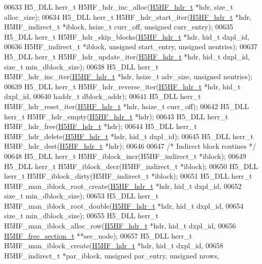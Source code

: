\begin{DoxyCode}
00633 H5\_DLL herr\_t H5HF\_hdr\_inc\_alloc(\hyperlink{struct_h5_h_f__hdr__t}{H5HF\_hdr\_t} *hdr, \textcolor{keywordtype}{size\_t} alloc\_size);
00634 H5\_DLL herr\_t H5HF\_hdr\_start\_iter(\hyperlink{struct_h5_h_f__hdr__t}{H5HF\_hdr\_t} *hdr, H5HF\_indirect\_t *iblock, hsize\_t curr\_off, \textcolor{keywordtype}{
      unsigned} curr\_entry);
00635 H5\_DLL herr\_t H5HF\_hdr\_skip\_blocks(\hyperlink{struct_h5_h_f__hdr__t}{H5HF\_hdr\_t} *hdr, hid\_t dxpl\_id,
00636     H5HF\_indirect\_t *iblock, \textcolor{keywordtype}{unsigned} start\_entry, \textcolor{keywordtype}{unsigned} nentries);
00637 H5\_DLL herr\_t H5HF\_hdr\_update\_iter(\hyperlink{struct_h5_h_f__hdr__t}{H5HF\_hdr\_t} *hdr, hid\_t dxpl\_id, \textcolor{keywordtype}{size\_t} min\_dblock\_size);
00638 H5\_DLL herr\_t H5HF\_hdr\_inc\_iter(\hyperlink{struct_h5_h_f__hdr__t}{H5HF\_hdr\_t} *hdr, hsize\_t adv\_size, \textcolor{keywordtype}{unsigned} nentries);
00639 H5\_DLL herr\_t H5HF\_hdr\_reverse\_iter(\hyperlink{struct_h5_h_f__hdr__t}{H5HF\_hdr\_t} *hdr, hid\_t dxpl\_id,
00640     haddr\_t dblock\_addr);
00641 H5\_DLL herr\_t H5HF\_hdr\_reset\_iter(\hyperlink{struct_h5_h_f__hdr__t}{H5HF\_hdr\_t} *hdr, hsize\_t curr\_off);
00642 H5\_DLL herr\_t H5HF\_hdr\_empty(\hyperlink{struct_h5_h_f__hdr__t}{H5HF\_hdr\_t} *hdr);
00643 H5\_DLL herr\_t H5HF\_hdr\_free(\hyperlink{struct_h5_h_f__hdr__t}{H5HF\_hdr\_t} *hdr);
00644 H5\_DLL herr\_t H5HF\_hdr\_delete(\hyperlink{struct_h5_h_f__hdr__t}{H5HF\_hdr\_t} *hdr, hid\_t dxpl\_id);
00645 H5\_DLL herr\_t H5HF\_hdr\_dest(\hyperlink{struct_h5_h_f__hdr__t}{H5HF\_hdr\_t} *hdr);
00646 
00647 \textcolor{comment}{/* Indirect block routines */}
00648 H5\_DLL herr\_t H5HF\_iblock\_incr(H5HF\_indirect\_t *iblock);
00649 H5\_DLL herr\_t H5HF\_iblock\_decr(H5HF\_indirect\_t *iblock);
00650 H5\_DLL herr\_t H5HF\_iblock\_dirty(H5HF\_indirect\_t *iblock);
00651 H5\_DLL herr\_t H5HF\_man\_iblock\_root\_create(\hyperlink{struct_h5_h_f__hdr__t}{H5HF\_hdr\_t} *hdr, hid\_t dxpl\_id,
00652     \textcolor{keywordtype}{size\_t} min\_dblock\_size);
00653 H5\_DLL herr\_t H5HF\_man\_iblock\_root\_double(\hyperlink{struct_h5_h_f__hdr__t}{H5HF\_hdr\_t} *hdr, hid\_t dxpl\_id,
00654     \textcolor{keywordtype}{size\_t} min\_dblock\_size);
00655 H5\_DLL herr\_t H5HF\_man\_iblock\_alloc\_row(\hyperlink{struct_h5_h_f__hdr__t}{H5HF\_hdr\_t} *hdr, hid\_t dxpl\_id,
00656     \hyperlink{struct_h5_h_f__free__section__t}{H5HF\_free\_section\_t} **sec\_node);
00657 H5\_DLL herr\_t H5HF\_man\_iblock\_create(\hyperlink{struct_h5_h_f__hdr__t}{H5HF\_hdr\_t} *hdr, hid\_t dxpl\_id,
00658     H5HF\_indirect\_t *par\_iblock, \textcolor{keywordtype}{unsigned} par\_entry, \textcolor{keywordtype}{unsigned} nrows,

\end{DoxyCode}
